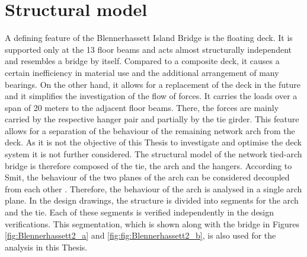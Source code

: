 \section{Structural model} \label{sec:met_str}
A defining feature of the Blennerhassett Island Bridge is the floating deck. It is supported only at the 13 floor beams and acts almost structurally independent and resembles a bridge by itself. Compared to a composite deck, it causes a certain inefficiency in material use and the additional arrangement of many bearings. On the other hand, it allows for a replacement of the deck in the future and it simplifies the investigation of the flow of forces. It carries the loads over a span of 20 meters to the adjacent floor beams. There, the forces are mainly carried by the respective hanger pair and partially by the tie girder. This feature allows for a separation of the behaviour of the remaining network arch from the deck. As it is not the objective of this Thesis to investigate and optimise the deck system it is not further considered. The structural model of the network tied-arch bridge is therefore composed of the tie, the arch and the hangers. According to Smit, the behaviour of the two planes of the arch can be considered decoupled from each other \cite{Smit}. Therefore, the behaviour of the arch is analysed in a single arch plane. In the design drawings, the structure is divided into segments for the arch and the tie. Each of these segments is verified independently in the design verifications. This segmentation, which is shown along with the bridge in Figures \ref{fig:Blennerhassett2_a} and \ref{fig:fig:Blennerhassett2_b}, is also used for the analysis in this Thesis.

